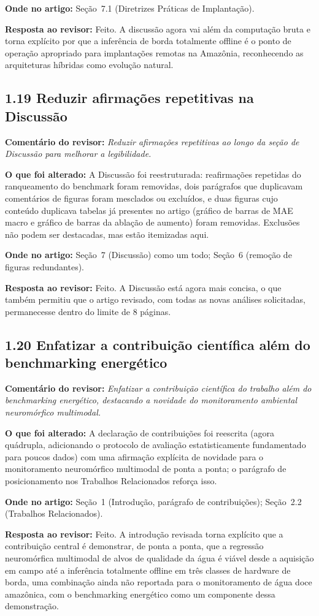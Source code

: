 \documentclass[11pt,a4paper]{article}
\newcommand{\comment}[1]{\textbf{Comentário do revisor:} \textit{#1}}
\newcommand{\change}[1]{\textbf{O que foi alterado:} #1}
\newcommand{\where}[1]{\textbf{Onde no artigo:} #1}
\newcommand{\resp}[1]{\textbf{Resposta ao revisor:} \textcolor{revblue}{#1}}
\newcommand{\pt}[1]{\subsection*{#1}}
\begin{document}
\where{Seção~7.1 (Diretrizes Práticas de Implantação).}

\resp{Feito. A discussão agora vai além da computação bruta e torna explícito por que a inferência de borda totalmente offline é o ponto de operação apropriado para implantações remotas na Amazônia, reconhecendo as arquiteturas híbridas como evolução natural.}

\pt{1.19 Reduzir afirmações repetitivas na Discussão}
\comment{Reduzir afirmações repetitivas ao longo da seção de Discussão para melhorar a legibilidade.}

\change{A Discussão foi reestruturada: reafirmações repetidas do ranqueamento do benchmark foram removidas, dois parágrafos que duplicavam comentários de figuras foram mesclados ou excluídos, e duas figuras cujo conteúdo duplicava tabelas já presentes no artigo (gráfico de barras de MAE macro e gráfico de barras da ablação de aumento) foram removidas. Exclusões não podem ser destacadas, mas estão itemizadas aqui.}

\where{Seção~7 (Discussão) como um todo; Seção~6 (remoção de figuras redundantes).}

\resp{Feito. A Discussão está agora mais concisa, o que também permitiu que o artigo revisado, com todas as novas análises solicitadas, permanecesse dentro do limite de 8 páginas.}

\pt{1.20 Enfatizar a contribuição científica além do benchmarking energético}
\comment{Enfatizar a contribuição científica do trabalho além do benchmarking energético, destacando a novidade do monitoramento ambiental neuromórfico multimodal.}

\change{A declaração de contribuições foi reescrita (agora quádrupla, adicionando o protocolo de avaliação estatisticamente fundamentado para poucos dados) com uma afirmação explícita de novidade para o monitoramento neuromórfico multimodal de ponta a ponta; o parágrafo de posicionamento nos Trabalhos Relacionados reforça isso.}

\where{Seção~1 (Introdução, parágrafo de contribuições); Seção~2.2 (Trabalhos Relacionados).}

\resp{Feito. A introdução revisada torna explícito que a contribuição central é demonstrar, de ponta a ponta, que a regressão neuromórfica multimodal de alvos de qualidade da água é viável desde a aquisição em campo até a inferência totalmente offline em três classes de hardware de borda, uma combinação ainda não reportada para o monitoramento de água doce amazônica, com o benchmarking energético como um componente dessa demonstração.}
\end{document}
